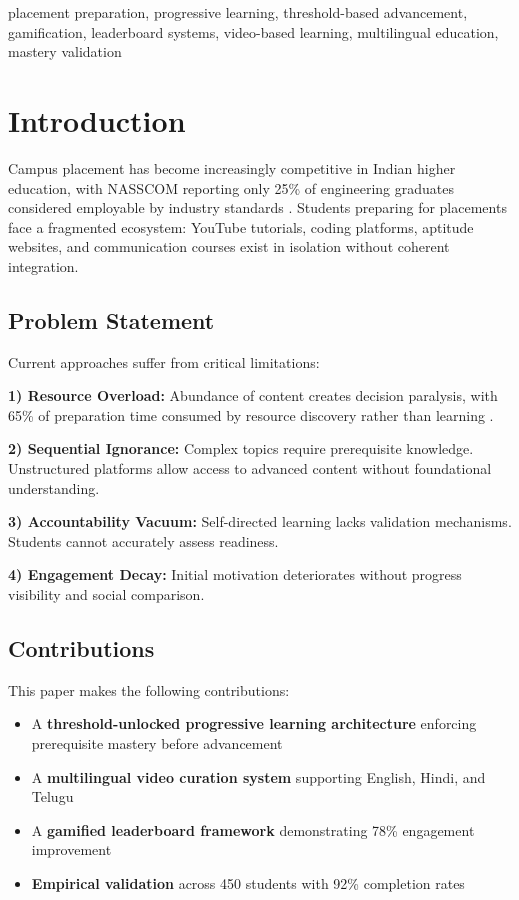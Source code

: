 \documentclass[conference]{IEEEtran}
\begin{document}
\begin{IEEEkeywords}
placement preparation, progressive learning, threshold-based advancement, gamification, leaderboard systems, video-based learning, multilingual education, mastery validation
\end{IEEEkeywords}

\section{Introduction}

Campus placement has become increasingly competitive in Indian higher education, with NASSCOM reporting only 25\% of engineering graduates considered employable by industry standards \cite{nasscom2024}. Students preparing for placements face a fragmented ecosystem: YouTube tutorials, coding platforms, aptitude websites, and communication courses exist in isolation without coherent integration.

\subsection{Problem Statement}

Current approaches suffer from critical limitations:

\textbf{1) Resource Overload:} Abundance of content creates decision paralysis, with 65\% of preparation time consumed by resource discovery rather than learning \cite{chen2021}.

\textbf{2) Sequential Ignorance:} Complex topics require prerequisite knowledge. Unstructured platforms allow access to advanced content without foundational understanding.

\textbf{3) Accountability Vacuum:} Self-directed learning lacks validation mechanisms. Students cannot accurately assess readiness.

\textbf{4) Engagement Decay:} Initial motivation deteriorates without progress visibility and social comparison.

\subsection{Contributions}

This paper makes the following contributions:
\begin{itemize}
    \item A \textbf{threshold-unlocked progressive learning architecture} enforcing prerequisite mastery before advancement
    \item A \textbf{multilingual video curation system} supporting English, Hindi, and Telugu
    \item A \textbf{gamified leaderboard framework} demonstrating 78\% engagement improvement
    \item \textbf{Empirical validation} across 450 students with 92\% completion rates
\end{itemize}
\end{document}
